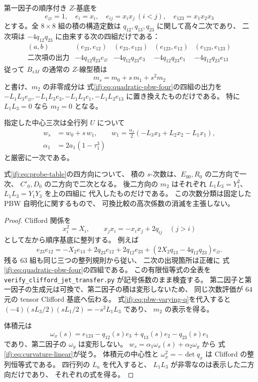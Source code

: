 \begin{proposition}
\label{ifj:prop:pbw-jet-degree}
第一因子の順序付き $Z$-基底を
\[
 e_\varnothing=1,\quad e_i=x_i,\quad
 e_{ij}=x_ix_j\ (i<j),\quad e_{123}=x_1x_2x_3
\]
とする。全 $8\times8$ 組の積の構造定数は
$q_{12},q_{13},q_{23}$ に関して高々二次であり、
二次項は $-4q_{12}q_{23}$ に由来する次の四組だけである：
\begin{equation}\label{ifj:eq:quadratic-pbw-four}
\begin{array}{c|cccc}
(a,b)&(e_{23},e_{12})&(e_{23},e_{123})
       &(e_{123},e_{12})&(e_{123},e_{123})\\\hline
\text{二次項の出力}&-4q_{12}q_{23}e_\varnothing&
 -4q_{12}q_{23}e_3&-4q_{12}q_{23}e_1&
 -4q_{12}q_{23}e_{13}
\end{array}
\end{equation}
従って $B_{sM}$ の通常の $Z$-線型積は
\[
                 m_s=m_0+s\,m_1+s^2m_2
\]
と書け、$m_2$ の非零成分は
式\eqref{ifj:eq:quadratic-pbw-four}の四組の出力を
$-L_1L_3e_\varnothing,-L_1L_3e_3,
-L_1L_3e_1,-L_1L_3e_{13}$ に置き換えたものだけである。
特に $L_1L_3=0$ なら $m_2=0$ となる。

指定した中心三次は全行列 $U$ について
\begin{equation}\label{ifj:eq:curvature-linear}
 \begin{split}
 w_s&=w_0+s\,w_1,\qquad
 w_1=\frac{\alpha_1}{2}(-L_3x_3+L_2x_2-L_1x_1),\\
 \alpha_1&=2a_1(1-\tau_1^3)
 \end{split}
\end{equation}
と厳密に一次である。

式\eqref{ifj:eq:probe-table}の四方向について、
積の $s$-次数は、$E_{00},R_0$ の二方向で一次、
$C'_0,D_0$ の二方向で二次となる。
後二方向の $m_2$ はそれぞれ
$L_1L_3=Y_1^2$、$L_1L_3=Y_1Y_3$ を上の四組に
代入したものだけである。
この次数分類は固定した PBW 自明化に関するもので、
可換比較の高次係数の消滅を主張しない。
\end{proposition}

\begin{proof}
Clifford 関係を
\[
 x_i^2=X_i,\qquad x_jx_i=-x_ix_j+2q_{ij}\quad(j>i)
\]
として左から順序基底に整列する。
例えば
\[
 e_{23}e_{12}
  =-X_2e_{13}+2q_{23}e_{12}
    +2q_{12}e_{23}
    +(2X_2q_{13}-4q_{12}q_{23})e_\varnothing.
\]
残る $63$ 組も同じ三つの整列規則から従い、
二次の出現箇所は正確に
式\eqref{ifj:eq:quadratic-pbw-four}の四組である。
この有限恒等式の全表を
\texttt{verify\_clifford\_jet\_transfer.py} が記号係数のまま検査する。
第二因子と第一因子の生成元は可換で、第二因子の積は変形しないため、
同じ次数評価が $64$ 元の tensor Clifford 基底へ伝わる。
式\eqref{ifj:eq:pbw-varying-q}を代入すると
$(-4)(sL_3/2)(sL_1/2)=-s^2L_1L_3$ であり、
$m_2$ の表示を得る。

体積元は
\[
 \omega_x(s)=e_{123}-q_{12}(s)e_3
                   +q_{13}(s)e_2-q_{23}(s)e_1
\]
であり、第二因子の $\omega_y$ は変形しない。
$w_s=\alpha_1\omega_x(s)+\alpha_2\omega_y$ から
式\eqref{ifj:eq:curvature-linear}が従う。
体積元の中心性と $\omega_x^2=-\det q_x$ は
Clifford の整列恒等式である。
四行列の $L_a$ を代入すると、
$L_1L_3$ が非零なのは表示した二方向だけであり、
それぞれの式を得る。
\end{proof}

